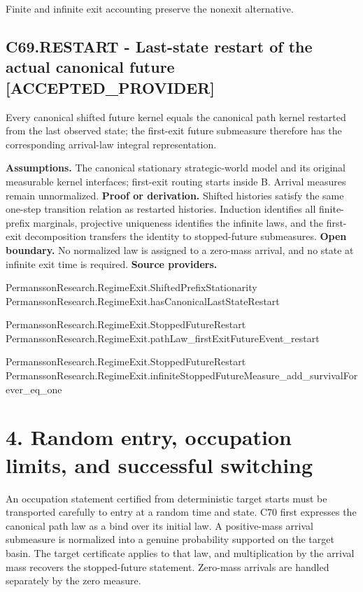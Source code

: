 \documentclass[11pt,a4paper]{article}
\newcommand{\companionEquation}[1]{\begin{center}\sbox{\companionEqBox}{$\displaystyle #1$}\ifdim\wd\companionEqBox>\linewidth\resizebox{\linewidth}{!}{\usebox{\companionEqBox}}\else\usebox{\companionEqBox}\fi\end{center}}
\begin{document}
\companionEquation{R_B^{(L)}(y,Y\setminus B)+\mathbb{P}_y(\tau_B>L)=1,\qquad R_B^{(\infty)}(y,Y\setminus B)+\mathbb{P}_y(\tau_B=\infty)=1.}
{\small Finite and infinite exit accounting preserve the nonexit alternative.}
\subsection*{C69.RESTART - Last-state restart of the actual canonical future [ACCEPTED\_PROVIDER]}
Every canonical shifted future kernel equals the canonical path kernel restarted from the last observed state; the first-exit future submeasure therefore has the corresponding arrival-law integral representation.

\textbf{Assumptions.} The canonical stationary strategic-world model and its original measurable kernel interfaces; first-exit routing starts inside B. Arrival measures remain unnormalized.
\textbf{Proof or derivation.} Shifted histories satisfy the same one-step transition relation as restarted histories. Induction identifies all finite-prefix marginals, projective uniqueness identifies the infinite laws, and the first-exit decomposition transfers the identity to stopped-future submeasures.
\textbf{Open boundary.} No normalized law is assigned to a zero-mass arrival, and no state at infinite exit time is required.
\textbf{Source providers.}
{\footnotesize\raggedright PermanssonRe\allowbreak{}search.Regim\allowbreak{}eExit.Shifte\allowbreak{}dPrefixStati\allowbreak{}onarity\\ PermanssonRe\allowbreak{}search.Regim\allowbreak{}eExit.hasCan\allowbreak{}onicalLastSt\allowbreak{}ateRestart\par}
{\footnotesize\raggedright PermanssonRe\allowbreak{}search.Regim\allowbreak{}eExit.Stoppe\allowbreak{}dFutureResta\allowbreak{}rt\\ PermanssonRe\allowbreak{}search.Regim\allowbreak{}eExit.pathLa\allowbreak{}w\_firstExitF\allowbreak{}utureEvent\_r\allowbreak{}estart\par}
{\footnotesize\raggedright PermanssonRe\allowbreak{}search.Regim\allowbreak{}eExit.Stoppe\allowbreak{}dFutureResta\allowbreak{}rt\\ PermanssonRe\allowbreak{}search.Regim\allowbreak{}eExit.infini\allowbreak{}teStoppedFut\allowbreak{}ureMeasure\_a\allowbreak{}dd\_survivalF\allowbreak{}orever\_eq\_on\allowbreak{}e\par}
\section{4. Random entry, occupation limits, and successful switching}
An occupation statement certified from deterministic target starts must be transported carefully to entry at a random time and state. C70 first expresses the canonical path law as a bind over its initial law. A positive-mass arrival submeasure is normalized into a genuine probability supported on the target basin. The target certificate applies to that law, and multiplication by the arrival mass recovers the stopped-future statement. Zero-mass arrivals are handled separately by the zero measure.
\end{document}
